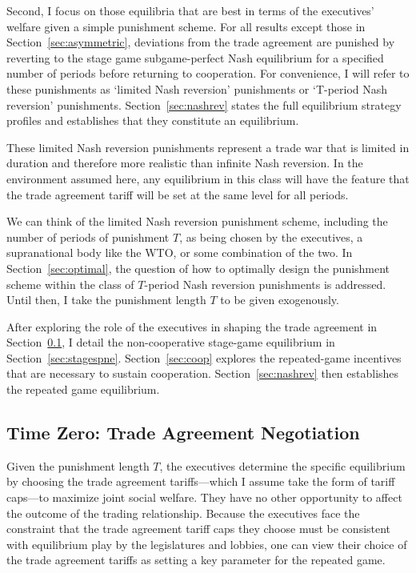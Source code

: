 \documentclass[authoryear, review]{elsarticle}
\begin{document}
Second, I focus on those equilibria that are best in terms of the executives' welfare given a simple punishment scheme. For all results except those in Section~\ref{sec:asymmetric}, deviations from the trade agreement are punished by reverting to the stage game subgame-perfect Nash equilibrium for a specified number of periods before returning to cooperation. For convenience, I will refer to these punishments as `limited Nash reversion' punishments or `T-period Nash reversion' punishments. Section~\ref{sec:nashrev} states the full equilibrium strategy profiles and establishes that they constitute an equilibrium.

These limited Nash reversion punishments represent a trade war that is limited in duration and therefore more realistic than infinite Nash reversion. In the environment assumed here, any equilibrium in this class will have the feature that the trade agreement tariff will be set at the same level for all periods.

We can think of the limited Nash reversion punishment scheme, including the number of periods of punishment $T$, as being chosen by the executives, a supranational body like the WTO, or some combination of the two. In Section~\ref{sec:optimal}, the question of how to optimally design the punishment scheme within the class of $T$-period Nash reversion punishments is addressed. Until then, I take the punishment length $T$ to be given exogenously.

After exploring the role of the executives in shaping the trade agreement in Section~\ref{sec:zero}, I detail the non-cooperative stage-game equilibrium in Section~\ref{sec:stagespne}. Section~\ref{sec:coop} explores the repeated-game incentives that are necessary to sustain cooperation. Section~\ref{sec:nashrev} then establishes the repeated game equilibrium.

\subsection{Time Zero: Trade Agreement Negotiation}
\label{sec:zero}
Given the punishment length $T$, the executives determine the specific equilibrium by choosing the trade agreement tariffs---which I assume take the form of tariff caps---to maximize joint social welfare. They have no other opportunity to affect the outcome of the trading relationship.  Because the executives face the constraint that the trade agreement tariff caps they choose must be consistent with equilibrium play by the legislatures and lobbies, one can view their choice of the trade agreement tariffs as setting a key parameter for the repeated game.
\end{document}
